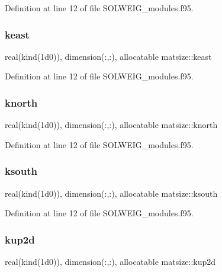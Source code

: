 Definition at line 12 of file S\+O\+L\+W\+E\+I\+G\+\_\+modules.\+f95.

\mbox{\label{namespacematsize_a27c05e9fb7688530f45b12163914f2f4}} 
\subsubsection{\texorpdfstring{keast}{keast}}
{\footnotesize\ttfamily real(kind(1d0)), dimension(\+:,\+:), allocatable matsize\+::keast}



Definition at line 12 of file S\+O\+L\+W\+E\+I\+G\+\_\+modules.\+f95.

\mbox{\label{namespacematsize_aeee3798c5f6672da6ea25aa8787b4ab4}} 
\subsubsection{\texorpdfstring{knorth}{knorth}}
{\footnotesize\ttfamily real(kind(1d0)), dimension(\+:,\+:), allocatable matsize\+::knorth}



Definition at line 12 of file S\+O\+L\+W\+E\+I\+G\+\_\+modules.\+f95.

\mbox{\label{namespacematsize_ad03d6ca2c8d26a947785c9dc94aa61db}} 
\subsubsection{\texorpdfstring{ksouth}{ksouth}}
{\footnotesize\ttfamily real(kind(1d0)), dimension(\+:,\+:), allocatable matsize\+::ksouth}



Definition at line 12 of file S\+O\+L\+W\+E\+I\+G\+\_\+modules.\+f95.

\mbox{\label{namespacematsize_a6f666c13da51f22100a0043f53e724ca}} 
\subsubsection{\texorpdfstring{kup2d}{kup2d}}
{\footnotesize\ttfamily real(kind(1d0)), dimension(\+:,\+:), allocatable matsize\+::kup2d}



